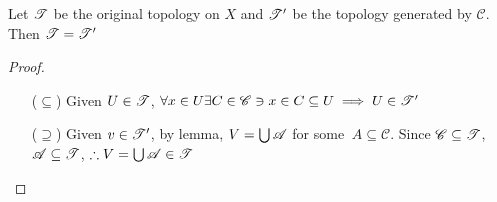 \begin{rmk*}
	Let $\mathscr{T}$ be the original topology on $X$ and $\mathscr{T}'$ be the topology generated by $\mathscr{C}$. Then $\mathscr{T} = \mathscr{T}'$
\end{rmk*}

\begin{proof}
	\begin{enumerate}
		\item[($\subseteq$)] Given $U \in \mathscr{T}$, $\forall x \in U \exists C \in \mathscr{C} \ni x \in C \subseteq U \implies U \in \mathscr{T}'$
		\item[($\supseteq$)] Given $v \in \mathscr{T}'$, by lemma, $V = \bigcup \mathscr{A}$ for some $\
		A \subseteq \mathscr{C}$. Since $\mathscr{C} \subseteq \mathscr{T}$, $\mathscr{A} \subseteq \mathscr{T}$, $\therefore V = \bigcup \mathscr{A} \in \mathscr{T}$
	\end{enumerate}
\end{proof}
















